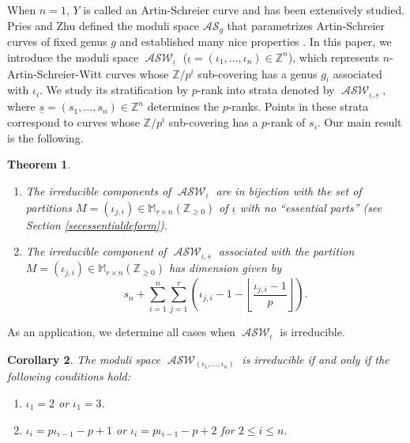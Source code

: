 \documentclass{compositio}
\newcommand{\mat}[1]{\todo[color=green]{MH: #1}}
\newtheorem{theorem}{Theorem}[section]
\newtheorem{corollary}[theorem]{Corollary}
\theoremstyle{remark}
\theoremstyle{remark}
\DeclareMathOperator{\ASW}{\mathcal{ASW}}
\begin{document}
When $n=1$, $Y$ is called an Artin-Schreier curve and has been extensively studied. Pries and Zhu defined the moduli space $\mathcal{AS}_g$ that parametrizes Artin-Schreier curves of fixed genus $g$ and established many nice properties \cite{MR2985514}. In this paper, we introduce the moduli space $\ASW_{\underline{\iota}}$ ($\underline{\iota} = (\iota_1, \ldots, \iota_n) \in \mathbb{Z}^n$), which represents $n$-Artin-Schreier-Witt curves whose $\mathbb{Z}/p^i$ sub-covering has a genus $g_i$ associated with $\iota_i$. We study its stratification by $p$-rank into strata denoted by $\ASW_{\underline{\iota}, \underline{s}}$, where $\underline{s} = (s_1, \ldots, s_n) \in \mathbb{Z}^n$ determines the $p$-ranks. Points in these strata correspond to curves whose $\mathbb{Z}/p^i$ sub-covering has a $p$-rank of $s_i$. Our main result is the following.

\begin{theorem}
\begin{enumerate}
\item The irreducible components of $\ASW_{\underline{\iota}}$ are in bijection with the set of partitions $M=(\iota_{j,i}) \in \mathbb{M}_{r\times n}(\mathbb{Z}_{\ge 0})$ of $\underline{\iota}$ with no ``essential parts'' (see Section \ref{secessentialdeform}).
\item The irreducible component of $\ASW_{\underline{\iota}, \underline{s}}$ associated with the partition $M=(\iota_{j,i}) \in \mathbb{M}_{r\times n}(\mathbb{Z}_{\ge 0})$ has dimension given by
\begin{equation*}
s_n+\sum_{i=1}^n \sum_{j=1}^r \left( \iota_{j,i} -1 - \left\lfloor \frac{\iota_{j,i}-1}{p} \right\rfloor \right).
\end{equation*}
\end{enumerate}
\end{theorem}


As an application, we determine all cases when $\ASW_{\underline{\iota}}$ is irreducible.

\begin{corollary}
The moduli space $\ASW_{(\iota_1, \ldots, \iota_n)}$ is irreducible if and only if the following conditions hold:
\begin{enumerate}[label*=\arabic*.]
\item $\iota_1 = 2$ or $\iota_1 = 3$.
\item $\iota_{i} = p\iota_{i-1}-p+1$ or $\iota_{i} = p\iota_{i-1}-p+2$ for $2 \leq i \leq n$.
\end{enumerate}
\end{corollary}
\end{document}
